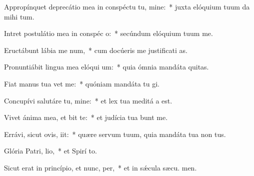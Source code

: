 \item Appropínquet deprecátio mea in conspéctu tu, mine:~* juxta elóquium tuum da mihi tum.
\item Intret postulátio mea in conspéc o:~* secúndum elóquium tuum  me.
\item Eructábunt lábia me num,~* cum docúeris me justificati as.
\item Pronuntiábit lingua mea elóqui um:~* quia ómnia mandáta  quitas.
\item Fiat manus tua  vet me:~* quóniam mandáta tu gi.
\item Concupívi salutáre tu, mine:~* et lex tua meditá a est.
\item Vivet ánima mea, et bit te:~* et judícia tua bunt me.
\item Errávi, sicut ovis,  iit:~* quære servum tuum, quia mandáta tua non  tus.
\item Glória Patri,  lio,~* et Spirí to.
\item Sicut erat in princípio, et nunc,  per,~* et in sǽcula sæcu. men.
